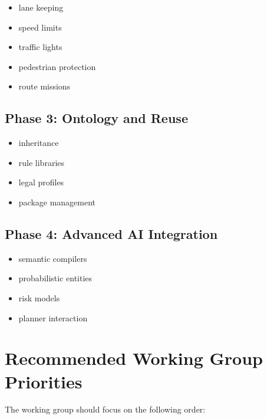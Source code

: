 \documentclass[a4paper,11pt]{article}
\begin{document}
\begin{itemize}
\item lane keeping
\item speed limits
\item traffic lights
\item pedestrian protection
\item route missions
\end{itemize}

\subsection*{Phase 3: Ontology and Reuse}

\begin{itemize}
\item inheritance
\item rule libraries
\item legal profiles
\item package management
\end{itemize}

\subsection*{Phase 4: Advanced AI Integration}

\begin{itemize}
\item semantic compilers
\item probabilistic entities
\item risk models
\item planner interaction
\end{itemize}

\section{Recommended Working Group Priorities}

The working group should focus on the following order:
\end{document}

